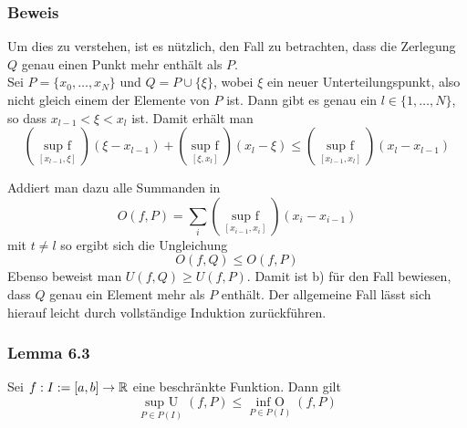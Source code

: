 \subsubsection*{Beweis}
Um dies zu verstehen, ist es nützlich, den Fall zu betrachten, dass die Zerlegung $Q$ genau einen Punkt mehr enthält als $P$.\\

Sei $P=\{x_0,\dots ,x_N\}$ und $Q=P\cup \{\xi\}$, wobei $\xi$ ein neuer Unterteilungspunkt, also nicht gleich einem der Elemente von $P$ ist. Dann gibt es genau ein $l\in \{ 1,\dots,N\}$, so dass $x_{l-1}<\xi <x_l$ ist. Damit erhält man \[(\mathop {\sup {\text{ }}f}\limits_{[{x_{l - 1}},\xi ]} )(\xi  - {x_{l - 1}}) + (\mathop {\sup {\text{ }}f}\limits_{[\xi ,{x_l}]} )({x_l} - \xi ) \le (\mathop {\sup {\text{ }}f}\limits_{[{x_{l - 1}},{x_l}]} )({x_l} - {x_{l - 1}})\]


\begin{center}
\end{center}


Addiert man dazu alle Summanden in \[O(f,P)=\sum\limits_i {(\mathop {\sup {\text{ }}f}\limits_{[{x_{i - 1}},{x_i}]} )({x_i} - {x_{i - 1}})} \]
mit $t\neq l$ so ergibt sich die Ungleichung \[O(f,Q)\leq O(f,P)\]
Ebenso beweist man $U(f,Q)\geq U(f,P)$. Damit ist b) für den Fall bewiesen, dass $Q$ genau ein Element mehr als $P$ enthält. Der allgemeine Fall lässt sich hierauf leicht durch vollständige Induktion zurückführen.

\subsubsection*{Lemma 6.3} Sei $f:I:=\lbrack a,b \rbrack \to \mathbb{R}$ eine beschränkte Funktion. Dann gilt \[\mathop {\sup {\text{ }}U}\limits_{P \in P(I)} (f,P) \le \mathop {\inf {\text{ }}O}\limits_{P \in P(I)} (f,P)\]

